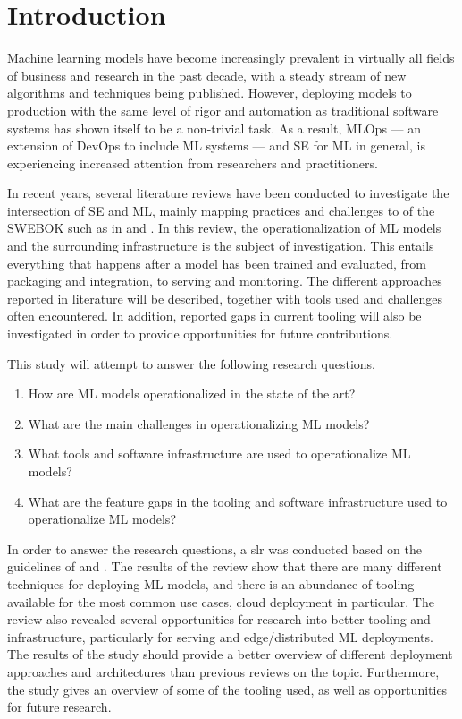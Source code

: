 \chapter{Introduction}
\label{ch:introduction}
Machine learning models have become increasingly prevalent in virtually all fields of business and research in the past decade, with a steady stream of new algorithms and techniques being published.
However, deploying models to production with the same level of rigor and automation as traditional software systems has shown itself to be a non-trivial task.
As a result, MLOps --- an extension of DevOps to include ML systems --- and SE for ML in general, is experiencing increased attention from researchers and practitioners.

In recent years, several literature reviews have been conducted to investigate the intersection of SE and ML, mainly mapping practices and challenges to  of the SWEBOK \cite{Bourque2014} such as in \cite{Kumeno2020} and \cite{Nascimento2020}.
In this review, the operationalization of ML models and the surrounding infrastructure is the subject of investigation.
This entails everything that happens after a model has been trained and evaluated, from packaging and integration, to serving and monitoring.
The different approaches reported in literature will be described, together with tools used and challenges often encountered.
In addition, reported gaps in current tooling will also be investigated in order to provide opportunities for future contributions.

This study will attempt to answer the following research questions.
\begin{enumerate}
    \item How are ML models operationalized in the state of the art?
    \item What are the main challenges in operationalizing ML models?
    \item What tools and software infrastructure are used to operationalize ML models?
    \item What are the feature gaps in the tooling and software infrastructure used to operationalize ML models?
\end{enumerate}
In order to answer the research questions, a \acrfull{slr} was conducted based on the guidelines of \cite{Kitchenham07guidelinesfor} and \cite{Wohlin2014}.
The results of the review show that there are many different techniques for deploying ML models, and there is an abundance of tooling available for the most common use cases, cloud deployment in particular.
The review also revealed several opportunities for research into better tooling and infrastructure, particularly for serving and edge/distributed ML deployments.
The results of the study should provide a better overview of different deployment approaches and architectures than previous reviews on the topic.
Furthermore, the study gives an overview of some of the tooling used, as well as opportunities for future research.

